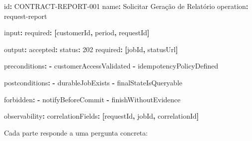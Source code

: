 \documentclass[
  10pt,
  a4paper,
  oneside]{book}
\newenvironment{Shaded}{}{}
\newcommand{\AttributeTok}[1]{\textcolor[rgb]{0.49,0.56,0.16}{#1}}
\newcommand{\DecValTok}[1]{\textcolor[rgb]{0.25,0.63,0.44}{#1}}
\newcommand{\FunctionTok}[1]{\textcolor[rgb]{0.02,0.16,0.49}{#1}}
\newcommand{\KeywordTok}[1]{\textcolor[rgb]{0.00,0.44,0.13}{\textbf{#1}}}
\begin{document}
\begin{Shaded}
\begin{Highlighting}[]
\FunctionTok{id}\KeywordTok{:}\AttributeTok{ CONTRACT{-}REPORT{-}001}
\FunctionTok{name}\KeywordTok{:}\AttributeTok{ Solicitar Geração de Relatório}
\FunctionTok{operation}\KeywordTok{:}\AttributeTok{ request{-}report}

\FunctionTok{input}\KeywordTok{:}
\AttributeTok{  }\FunctionTok{required}\KeywordTok{:}\AttributeTok{ }\KeywordTok{[}\AttributeTok{customerId}\KeywordTok{,}\AttributeTok{ period}\KeywordTok{,}\AttributeTok{ requestId}\KeywordTok{]}

\FunctionTok{output}\KeywordTok{:}
\AttributeTok{  }\FunctionTok{accepted}\KeywordTok{:}
\AttributeTok{    }\FunctionTok{status}\KeywordTok{:}\AttributeTok{ }\DecValTok{202}
\AttributeTok{    }\FunctionTok{required}\KeywordTok{:}\AttributeTok{ }\KeywordTok{[}\AttributeTok{jobId}\KeywordTok{,}\AttributeTok{ statusUrl}\KeywordTok{]}

\FunctionTok{preconditions}\KeywordTok{:}
\AttributeTok{  }\KeywordTok{{-}}\AttributeTok{ customerAccessValidated}
\AttributeTok{  }\KeywordTok{{-}}\AttributeTok{ idempotencyPolicyDefined}

\FunctionTok{postconditions}\KeywordTok{:}
\AttributeTok{  }\KeywordTok{{-}}\AttributeTok{ durableJobExists}
\AttributeTok{  }\KeywordTok{{-}}\AttributeTok{ finalStateIsQueryable}

\FunctionTok{forbidden}\KeywordTok{:}
\AttributeTok{  }\KeywordTok{{-}}\AttributeTok{ notifyBeforeCommit}
\AttributeTok{  }\KeywordTok{{-}}\AttributeTok{ finishWithoutEvidence}

\FunctionTok{observability}\KeywordTok{:}
\AttributeTok{  }\FunctionTok{correlationFields}\KeywordTok{:}\AttributeTok{ }\KeywordTok{[}\AttributeTok{requestId}\KeywordTok{,}\AttributeTok{ jobId}\KeywordTok{,}\AttributeTok{ correlationId}\KeywordTok{]}
\end{Highlighting}
\end{Shaded}

Cada parte responde a uma pergunta concreta:
\end{document}
